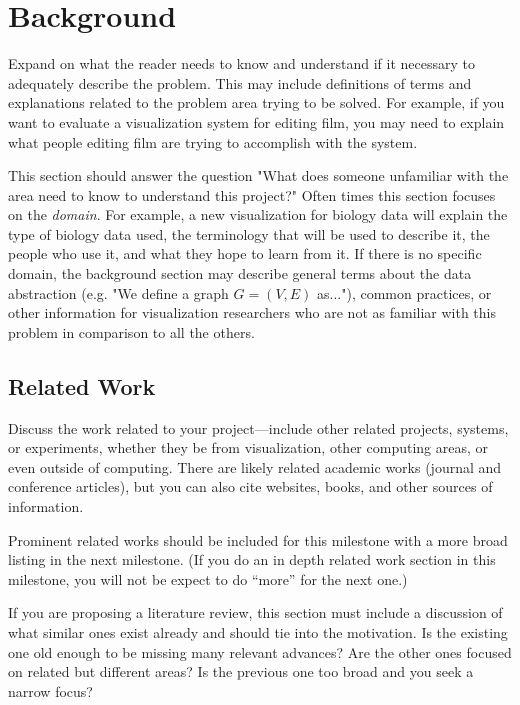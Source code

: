 \section{Background}
\label{sec:background}

Expand on what the reader needs to know and understand if it necessary to
adequately describe the problem. This may include definitions of terms and
explanations related to the problem area trying to be solved. For example, if
you want to evaluate a visualization system for editing film, you may need to
explain what people editing film are trying to accomplish with the system.

This section should answer the question "What does someone unfamiliar with the
area need to know to understand this project?" Often times this section
focuses on the \textit{domain}. For example, a new visualization for biology
data will explain the type of biology data used, the terminology that will be
used to describe it, the people who use it, and what they hope to learn from
it. If there is no specific domain, the background section may describe
general terms about the data abstraction (e.g. "We define a graph $G = (V, E)$
as..."), common practices, or other information for visualization researchers
who are not as familiar with this problem in comparison to all the others. 

\subsection{Related Work}
\label{sec:related}

Discuss the work related to your project---include other related projects,
systems, or experiments, whether they be from visualization, other computing
areas, or even outside of computing. There are likely related academic works
(journal and conference articles), but you can also cite websites, books, and
other sources of information.

Prominent related works should be included for this milestone with a more
broad listing in the next milestone. (If you do an in depth related work
section in this milestone, you will not be expect to do ``more'' for the next
one.) 

If you are proposing a literature review, this section must include a
discussion of what similar ones exist already and should tie into the
motivation. Is the existing one old enough to be missing many relevant
advances? Are the other ones focused on related but different areas? Is the
previous one too broad and you seek a narrow focus?

